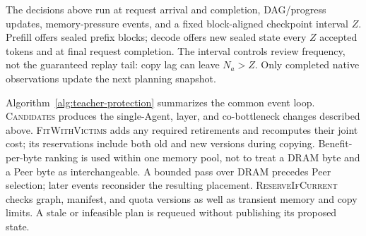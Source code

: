 The decisions above run at request arrival and completion, DAG/progress
updates, memory-pressure events, and a fixed block-aligned checkpoint
interval $Z$. Prefill offers sealed prefix blocks; decode offers new
sealed state every $Z$ accepted tokens and at final request completion.
The interval controls review frequency, not the guaranteed replay tail:
copy lag can leave $N_a>Z$. Only completed native observations update
the next planning snapshot.

Algorithm~\ref{alg:teacher-protection} summarizes the common event loop.
\textsc{Candidates} produces the single-Agent, layer, and co-bottleneck
changes described above. \textsc{FitWithVictims} adds any required
retirements and recomputes their joint cost; its reservations include
both old and new versions during copying. Benefit-per-byte ranking is
used within one memory pool, not to treat a DRAM byte and a Peer byte
as interchangeable. A bounded pass over DRAM precedes Peer selection;
later events reconsider the resulting placement. \textsc{ReserveIfCurrent}
checks graph, manifest, and quota versions as well as transient memory
and copy limits. A stale or infeasible plan is requeued without publishing
its proposed state.

